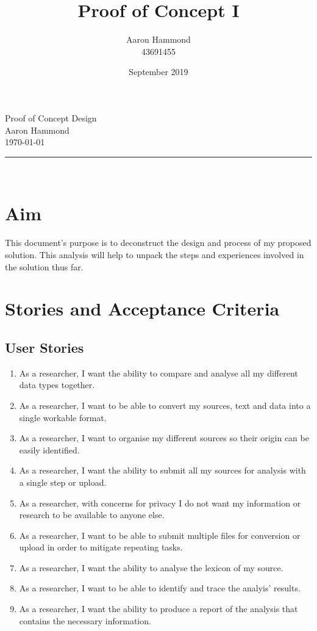\documentclass{article}
\title{Proof of Concept I}
\author{Aaron Hammond\\43691455}
\date{September 2019}
\newcommand\HRule{\rule{\textwidth}{1pt}} %
\begin{document}
\begin{center}
\huge{Proof of Concept Design}\\[0.4cm]
\huge{Aaron Hammond}\\[0.3cm]
\large{\today}\\[0.4cm]

\HRule \\[1cm]
\end{center}

\section{Aim}
This document's purpose is to deconstruct the design and process of my proposed solution. This analysis will help to unpack the steps and experiences involved in the solution thus far.

\section{Stories and Acceptance Criteria}
\subsection{User Stories}
\begin{enumerate}
    \item As a researcher, I want the ability to compare and analyse all my different data types together.

    \item As a researcher, I want to be able to convert my sources, text and data into a single workable format.
    
    \item As a researcher, I want to organise my different sources so their origin can be easily identified.
    
    \item As a researcher, I want the ability to submit all my sources for analysis with a single step or upload.
    
    \item As a researcher, with concerns for privacy I do not want my information or research to be available to anyone else.
    
    \item As a researcher, I want to be able to submit multiple files for conversion or upload in order to mitigate repeating tasks.
    
    \item As a researcher, I want the ability to analyse the lexicon of my source.
    
    \item As a researcher, I want to be able to identify and trace the analyis' results.
    
    \item As a researcher, I want the ability to produce a report of the analysis that contains the necessary information.
    
\end{enumerate}
\end{document}
